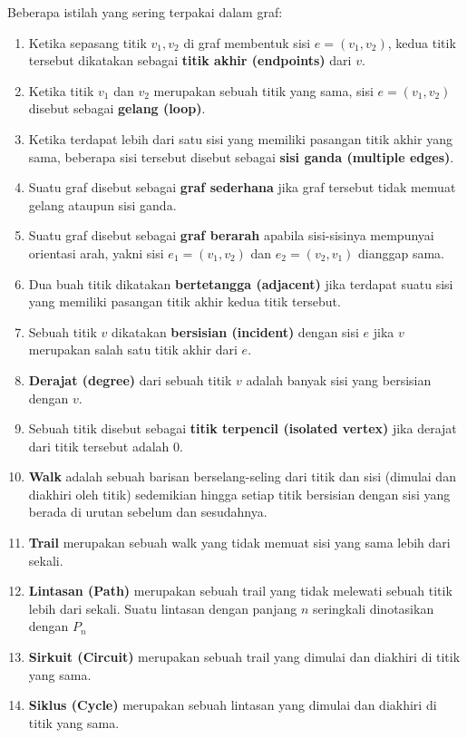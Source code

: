 \documentclass[11pt]{scrartcl}
\begin{document}
Beberapa istilah yang sering terpakai dalam graf:
\begin{enumerate}
    \item Ketika sepasang titik $v_1,v_2$ di graf membentuk sisi $e = (v_1, v_2)$, kedua titik tersebut dikatakan sebagai \textbf{titik akhir (endpoints)} dari $v$.
    \item Ketika titik $v_1$ dan $v_2$ merupakan sebuah titik yang sama, sisi $e = (v_1, v_2)$ disebut sebagai \textbf{gelang (loop)}.
    \item Ketika terdapat lebih dari satu sisi yang memiliki pasangan titik akhir yang sama, beberapa sisi tersebut disebut sebagai \textbf{sisi ganda (multiple edges)}.
    \item Suatu graf disebut sebagai \textbf{graf sederhana} jika graf tersebut tidak memuat gelang ataupun sisi ganda.
    \item Suatu graf disebut sebagai \textbf{graf berarah} apabila sisi-sisinya mempunyai orientasi arah, yakni sisi $e_1 = (v_1, v_2)$ dan $e_2 = (v_2, v_1)$ dianggap sama.
    \item Dua buah titik dikatakan \textbf{bertetangga (adjacent)} jika terdapat suatu sisi yang memiliki pasangan titik akhir kedua titik tersebut.
    \item Sebuah titik $v$ dikatakan \textbf{bersisian (incident)} dengan sisi $e$ jika $v$ merupakan salah satu titik akhir dari $e$.
    \item \textbf{Derajat (degree)} dari sebuah titik $v$ adalah banyak sisi yang bersisian dengan $v$.
    \item Sebuah titik disebut sebagai \textbf{titik terpencil (isolated vertex)} jika derajat dari titik tersebut adalah 0.
    \item \textbf{Walk} adalah sebuah barisan berselang-seling dari titik dan sisi (dimulai dan diakhiri oleh titik) sedemikian hingga setiap titik bersisian dengan sisi yang berada di urutan sebelum dan sesudahnya.
    \item \textbf{Trail} merupakan sebuah walk yang tidak memuat sisi yang sama lebih dari sekali.
    \item \textbf{Lintasan (Path)} merupakan sebuah trail yang tidak melewati sebuah titik lebih dari sekali. Suatu lintasan dengan panjang $n$ seringkali dinotasikan dengan $P_n$
    \item \textbf{Sirkuit (Circuit)} merupakan sebuah trail yang dimulai dan diakhiri di titik yang sama.
    \item \textbf{Siklus (Cycle)} merupakan sebuah lintasan yang dimulai dan diakhiri di titik yang sama.

\end{enumerate}
\end{document}
